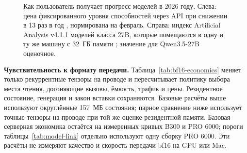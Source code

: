 \begin{figure}[t]
\centering
{}
\caption{Как пользователь получает прогресс моделей в 2026 году. Слева: цена фиксированного уровня способностей через
API при снижении в 13 раз в год \cite{epoch2026price}, нормирована на февраль. Справа: индекс Artificial Analysis v4.1.1
моделей класса 27B, которые помещаются в одну и ту же машину с 32~ГБ памяти \cite{aaindex}; значение для Qwen3.5-27B
оценочное.}
\label{fig:progress}
\end{figure}

\textbf{Чувствительность к формату передачи.} Таблица~\ref{tab:bf16-economics} меняет только рекуррентные тензоры
на проводе и пересчитывает политику выбора места чтения, догоняющие вызовы, ёмкость, трафик и цены.
Резидентное состояние, генерация и закон вставки сохраняются. Базовые расчёты выше используют округлённые 157~МБ
состояния; парное сравнение ниже использует точные тензоры на проводе при той же оценке резидентной памяти.
Базовая серверная экономика остаётся на измеренных кривых B300 и PRO 6000;
пороги таблицы~\ref{tab:model-link} отдельно используют одну сборку PRO 6000.
Эти расчёты не измеряют качество и скорость передачи bf16 на GPU или Mac.

